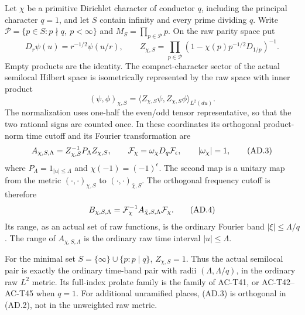 \begin{theorem}
\label{AC-T47}
Let \(\chi\) be a primitive Dirichlet character of conductor
\(q\), including the principal character \(q=1\), and let
\(S\) contain infinity and every prime dividing \(q\).
Write \(\mathcal P=\{p\in S:p\nmid q,\ p<\infty\}\) and
\(M_S=\prod_{p\in\mathcal P}p\).
On the raw parity space put
\[
 D_r\psi(u)=r^{-1/2}\psi(u/r),\qquad
 Z_{\chi,S}
    =\prod_{p\in\mathcal P}
        (1-\chi(p)p^{-1/2}D_{1/p})^{-1}.
 \tag{AD.1}
\]
Empty products are the identity.
The compact-character sector of the actual semilocal
Hilbert space is isometrically represented by the raw
space with inner product
\[
           (\psi,\phi)_{\chi,S}
                        =\langle Z_{\chi,S}\psi,
                                   Z_{\chi,S}\phi\rangle_{L^2(du)}.
 \tag{AD.2}
\]
The normalization uses one-half the even/odd tensor
representative, so that the two rational signs are
counted once.
In these coordinates its orthogonal product-norm
time cutoff and its Fourier transformation are
\[
 A_{\chi,S,\Lambda}=Z_{\chi,S}^{-1}P_\Lambda Z_{\chi,S},
 \qquad
 {\cal F}_\chi=\omega_\chi D_q\mathcal F_\epsilon,
 \qquad |\omega_\chi|=1,
 \tag{AD.3}
\]
where \(P_\Lambda=1_{|u|\leq\Lambda}\) and
\(\chi(-1)=(-1)^\epsilon\).
The second map is a unitary map from the metric
\((\cdot,\cdot)_{\chi,S}\) to
\((\cdot,\cdot)_{\bar\chi,S}\).
The orthogonal frequency cutoff is therefore
\[
 B_{\chi,S,\Lambda}
       ={\cal F}_\chi^{-1}A_{\bar\chi,S,\Lambda}{\cal F}_\chi .
 \tag{AD.4}
\]
Its range, as an actual set of raw functions, is
the ordinary Fourier band \(|\xi|\leq\Lambda/q\).
The range of \(A_{\chi,S,\Lambda}\) is the ordinary
raw time interval \(|u|\leq\Lambda\).

For the minimal set \(S=\{\infty\}\cup\{p:p\mid q\}\),
\(Z_{\chi,S}=1\).  Thus the actual semilocal pair is
exactly the ordinary time-band pair with radii
\((\Lambda,\Lambda/q)\), in the ordinary raw \(L^2\)
metric.  Its full-index prolate family is the family
of AC-T41, or AC-T42--AC-T45 when \(q=1\).
For additional unramified places, (AD.3) is
orthogonal in (AD.2), not in the unweighted raw metric.
\end{theorem}

